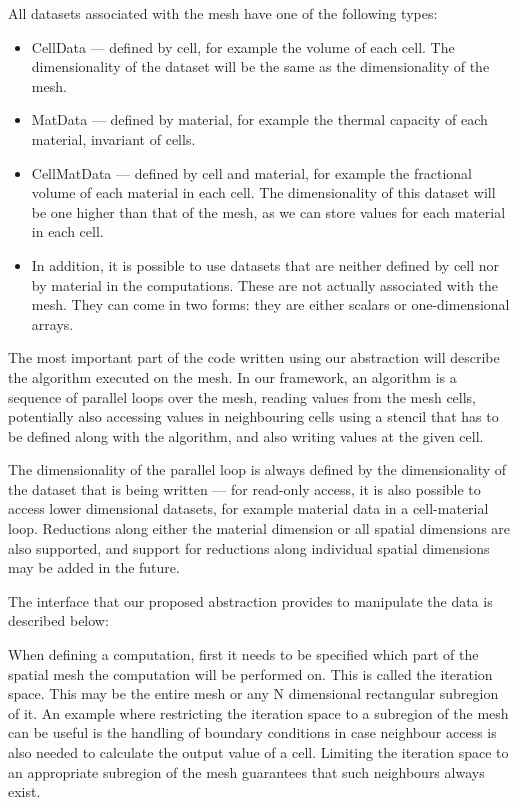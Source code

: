 \documentclass[fontsize=11pt, appendixprefix=true]{scrreprt}
\begin{document}
All datasets associated with the mesh have one of the following types:

\begin{itemize}
\item CellData --- defined by cell, for example the volume of each cell. The
  dimensionality of the dataset will be the same as the dimensionality of the
  mesh.
\item MatData --- defined by material, for example the thermal capacity of each
  material, invariant of cells.
\item CellMatData --- defined by cell and material, for example the fractional
  volume of each material in each cell. The dimensionality of this dataset will
  be one higher than that of the mesh, as we can store values for each material
  in each cell.
\item In addition, it is possible to use datasets that are neither defined by
  cell nor by material in the computations. These are not actually associated
  with the mesh. They can come in two forms: they are either scalars or
  one-dimensional arrays.
\end{itemize}

The most important part of the code written using our abstraction will describe
the algorithm executed on the mesh. In our framework, an algorithm is a sequence
of parallel loops over the mesh, reading values from the mesh cells, potentially
also accessing values in neighbouring cells using a stencil that has to be
defined along with the algorithm, and also writing values at the given cell.

The dimensionality of the parallel loop is always defined by the dimensionality
of the dataset that is being written --- for read-only access, it is also
possible to access lower dimensional datasets, for example material data in a
cell-material loop. Reductions along either the material dimension or all
spatial dimensions are also supported, and support for reductions along
individual spatial dimensions may be added in the future.

The interface that our proposed abstraction provides to manipulate the data is
described below:

When defining a computation, first it needs to be specified which part of the
spatial mesh the computation will be performed on. This is called the iteration
space. This may be the entire mesh or any N dimensional rectangular subregion of
it. An example where restricting the iteration space to a subregion of the mesh
can be useful is the handling of boundary conditions in case neighbour access is
also needed to calculate the output value of a cell. Limiting the iteration
space to an appropriate subregion of the mesh guarantees that such neighbours
always exist.
\end{document}

